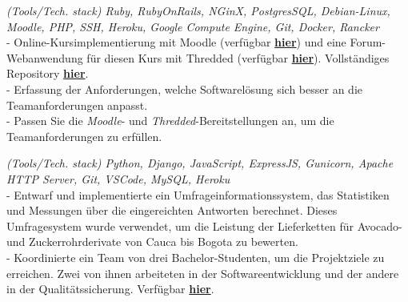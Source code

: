 \documentclass[]{CV-JuanCamiloFlorez}
\begin{document}
\begin{minipage}[t]{0.66\textwidth}
    \noindent
    \focusareas{}
    \textit{(Tools/Tech. stack) Ruby, RubyOnRails, NGinX, PostgresSQL, Debian-Linux, Moodle, PHP, SSH, Heroku, Google Compute Engine, Git, Docker, Rancker} \\
        - Online-Kursimplementierung mit Moodle (verfügbar \textbf{\href{https://gitlab.com/VanJFlorez/animal-modeling-ethics/tree/master/docs/4 LMS build}{hier}}) und eine Forum-Webanwendung für diesen Kurs mit Thredded (verfügbar \textbf{\href{https://gitlab.com/VanJFlorez/animal-modeling-ethics/blob/master/docs/3\%20Social\%20WebApp/CP\%20etica\%20animal\%20webApp.pdf}{hier}}). Vollständiges Repository \textbf{\href{https://gitlab.com/VanJFlorez/animal-modeling-ethics/}{hier}}. \\
        - Erfassung der Anforderungen, welche Softwarelösung sich besser an die Teamanforderungen anpasst. \\
        - Passen Sie die \textit{Moodle}- und \textit{Thredded}-Bereitstellungen an, um die Teamanforderungen zu erfüllen. \\
        \sectionsep

    \noindent
    \focusareas{}
    \textit{(Tools/Tech. stack) Python, Django, JavaScript, ExpressJS, Gunicorn, Apache HTTP Server, Git, VSCode, MySQL, Heroku} \\
        - Entwarf und implementierte ein Umfrageinformationssystem, das Statistiken und Messungen über die eingereichten Antworten berechnet. Dieses Umfragesystem wurde verwendet, um die Leistung der Lieferketten für Avocado- und Zuckerrohrderivate von Cauca bis Bogota zu bewerten. \\
        - Koordinierte ein Team von drei Bachelor-Studenten, um die Projektziele zu erreichen. Zwei von ihnen arbeiteten in der Softwareentwicklung und der andere in der Qualitätssicherung. Verfügbar \textbf{\href{https://gitlab.com/VanJFlorez/sepro-webapp}{hier}}. \\
        \sectionsep

 
\vspace{\topsep} %



\end{minipage}
\end{document}
